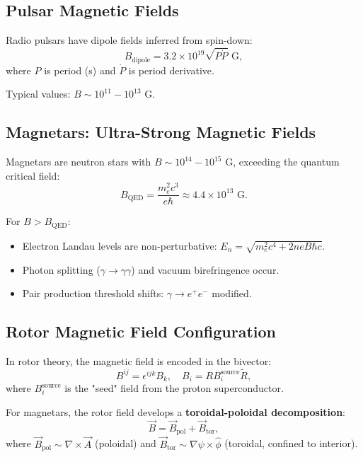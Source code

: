 \documentclass[12pt,a4paper]{article}
\theoremstyle{definition}
\theoremstyle{remark}
\begin{document}
\subsection{Pulsar Magnetic Fields}

Radio pulsars have dipole fields inferred from spin-down:
\begin{equation}
B_{\text{dipole}} = 3.2 \times 10^{19} \sqrt{P \dot{P}} \text{ G},
\end{equation}
where $P$ is period (s) and $\dot{P}$ is period derivative.

Typical values: $B \sim 10^{11}-10^{13}$ G.

\subsection{Magnetars: Ultra-Strong Magnetic Fields}

Magnetars are neutron stars with $B \sim 10^{14}-10^{15}$ G, exceeding the quantum critical field:
\begin{equation}
B_{\text{QED}} = \frac{m_e^2 c^3}{e\hbar} \approx 4.4 \times 10^{13} \text{ G}.
\end{equation}

For $B > B_{\text{QED}}$:
\begin{itemize}
\item Electron Landau levels are non-perturbative: $E_n = \sqrt{m_e^2 c^4 + 2neB\hbar c}$.
\item Photon splitting ($\gamma \to \gamma\gamma$) and vacuum birefringence occur.
\item Pair production threshold shifts: $\gamma \to e^+ e^-$ modified.
\end{itemize}

\subsection{Rotor Magnetic Field Configuration}

In rotor theory, the magnetic field is encoded in the bivector:
\begin{equation}
B^{ij} = \epsilon^{ijk} B_k, \quad B_i = R B_i^{\text{source}} \tilde{R},
\end{equation}
where $B_i^{\text{source}}$ is the "seed" field from the proton superconductor.

For magnetars, the rotor field develops a \textbf{toroidal-poloidal decomposition}:
\begin{equation}
\vec{B} = \vec{B}_{\text{pol}} + \vec{B}_{\text{tor}},
\end{equation}
where $\vec{B}_{\text{pol}} \sim \nabla \times \vec{A}$ (poloidal) and $\vec{B}_{\text{tor}} \sim \nabla \psi \times \hat{\phi}$ (toroidal, confined to interior).
\end{document}
